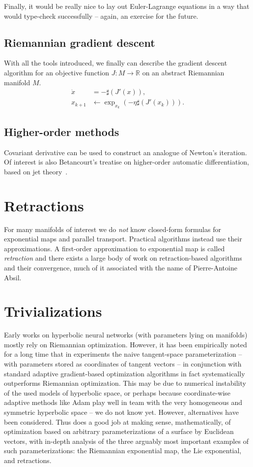 Finally, it would be really nice to lay out Euler-Lagrange equations in a way
that would type-check successfully -- again, an exercise for the future.

\subsection*{Riemannian gradient descent}

With all the tools introduced, we finally can describe the gradient descent
algorithm for an objective function \( J: M \to \mathbb{R} \) on an abstract
Riemannian manifold \( M \).
\begin{align*}
\dot x &= -\sharp(J'(x)),\\
x_{k+1} &\leftarrow \exp_{x_k}(-\eta \sharp(J'(x_k))).
\end{align*}

\subsection*{Higher-order methods}

Covariant derivative can be used to construct an analogue of Newton's
iteration. Of interest is also Betancourt's treatise on higher-order automatic
differentiation, based on jet theory~\cite{betancourt2018geometric}.

\section*{Retractions}

For many manifolds of interest we do \emph{not} know closed-form formulas for
exponential maps and parallel transport. Practical algorithms instead use their
approximations. A first-order approximation to exponential map is called
\emph{retraction} and there exists a large body of work on retraction-based
algorithms and their convergence, much of it associated with the name of
Pierre-Antoine Absil.

\section*{Trivializations}

Early works on hyperbolic neural networks (with parameters lying on manifolds)
mostly rely on Riemannian optimization. However, it has been empirically noted
for a long time that in experiments the naive tangent-space parameterization --
with parameters stored as coordinates of tangent vectors -- in conjunction with
standard adaptive gradient-based optimization algorithms in fact systematically
outperforms Riemannian optimization. This may be due to numerical instability
of the used models of hyperbolic space, or perhaps because coordinate-wise
adaptive methods like Adam play well in team with the very homogeneous and
symmetric hyperbolic space -- we do not know yet. However, alternatives have
been considered. Thus \citet{trivializations} does a good job at making sense,
mathematically, of optimization based on arbitrary parameterizations of a
surface by Euclidean vectors, with in-depth analysis of the three arguably most
important examples of such parameterizations: the Riemannian exponential map,
the Lie exponential, and retractions.

